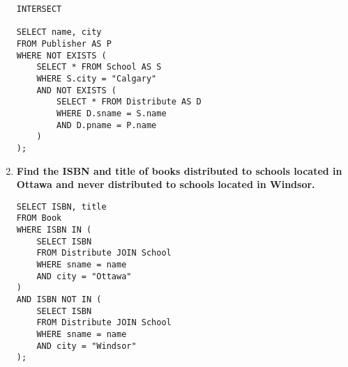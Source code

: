 \documentclass{article}
\begin{document}
\begin{enumerate}
\begin{verbatim}
INTERSECT

SELECT name, city 
FROM Publisher AS P 
WHERE NOT EXISTS (
    SELECT * FROM School AS S 
    WHERE S.city = "Calgary" 
    AND NOT EXISTS (
        SELECT * FROM Distribute AS D 
        WHERE D.sname = S.name 
        AND D.pname = P.name 
    )
);
\end{verbatim}

\item \textbf{Find the ISBN and title of books distributed to schools located in Ottawa and never distributed to schools located in Windsor.}
\begin{verbatim}
SELECT ISBN, title 
FROM Book 
WHERE ISBN IN ( 
    SELECT ISBN 
    FROM Distribute JOIN School 
    WHERE sname = name 
    AND city = "Ottawa"
) 
AND ISBN NOT IN (
    SELECT ISBN 
    FROM Distribute JOIN School 
    WHERE sname = name 
    AND city = "Windsor"
);
\end{verbatim}
\end{enumerate}

\newpage
\end{document}
